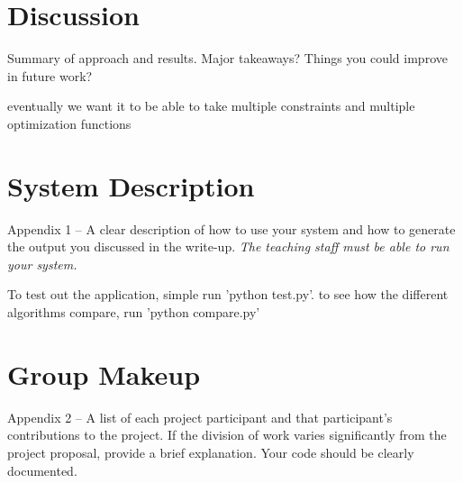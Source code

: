 \documentclass[11pt]{article}
\begin{document}
\section{Discussion}

Summary of approach and results. Major takeaways? Things you could improve in future work?\par 
\vspace{2mm}
\noindent eventually we want it to be able to take multiple constraints and multiple optimization functions


\appendix

\section{System Description}

 Appendix 1 – A clear description of how to use your system and how to generate the output you discussed in the write-up. \emph{The teaching staff must be able to run your system.}\par
 
 \noindent To test out the application, simple run 'python test.py'. to see how the different algorithms compare, run 'python compare.py'
 

\section{Group Makeup}

 Appendix 2 – A list of each project participant and that
participant’s contributions to the project. If the division of work
varies significantly from the project proposal, provide a brief
explanation.  Your code should be clearly documented. 



 

\end{document}
